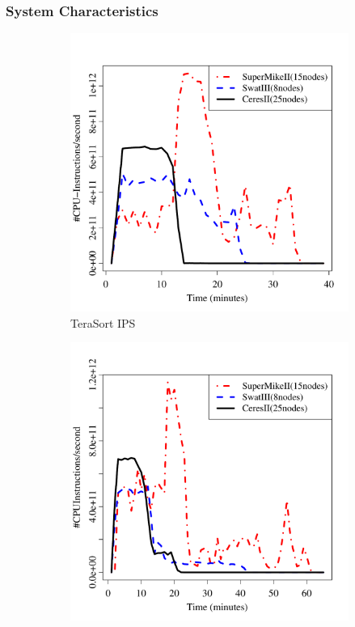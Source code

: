 \documentclass[journal]{IEEEtran}
\begin{document}
\subsubsection{System Characteristics}
\begin{figure}[htb]
	\begin{subfigure}[b]{0.23\textwidth}
                \includegraphics[width=\textwidth]{Figures/SystemFigures/TeraSortIPS.pdf}
                \caption{TeraSort IPS}
                \label{fig:TeraSortIPS}
    \end{subfigure}
 	\begin{subfigure}[b]{0.23\textwidth}
                \includegraphics[width=\textwidth]{Figures/SystemFigures/WordCountIPS.pdf}

\end{subfigure}
\end{figure}
\end{document}
